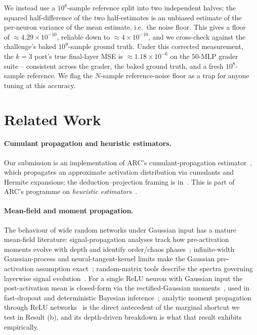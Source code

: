 \documentclass[11pt]{article}
\theoremstyle{remark}
\begin{document}
We instead use a $10^8$-sample reference split into two independent halves; the
squared half-difference of the two half-estimates is an unbiased estimate of the
per-neuron variance of the mean estimate, i.e.\ the noise floor. This gives a
floor of $\approx 4.29\times10^{-10}$, reliable down to $\approx 4\times
10^{-10}$, and we cross-check against the challenge's baked $10^9$-sample ground
truth. Under this corrected measurement, the $k{=}3$ port's true final-layer
MSE is $\approx 1.18\times10^{-6}$ on the $50$-MLP grader suite -- consistent
across the grader, the baked ground truth, and a fresh $10^8$-sample reference.
We flag the $N$-sample reference-noise floor as a trap for anyone tuning at this
accuracy.

\section{Related Work}
\label{sec:related}

\paragraph{Cumulant propagation and heuristic estimators.}
Our submission is an implementation of ARC's cumulant-propagation
estimator~\cite{wu2026wide}, which propagates an approximate activation
distribution via cumulants and Hermite expansions; the deduction--projection
framing is in~\cite{wu2025deduction}. This is part of ARC's programme on
\emph{heuristic estimators}~\cite{christiano2024iterated, xu2021lpe}.

\paragraph{Mean-field and moment propagation.}
The behaviour of wide random networks under Gaussian input has a mature
mean-field literature: signal-propagation analyses track how pre-activation
moments evolve with depth and identify order/chaos
phases~\cite{poole2016exponential, schoenholz2017deep}; infinite-width
Gaussian-process and neural-tangent-kernel limits make the Gaussian
pre-activation assumption exact~\cite{lee2018deep, jacot2018ntk};
random-matrix tools describe the spectra governing layerwise signal
evolution~\cite{pennington2017nonlinear}. For a single ReLU neuron with
Gaussian input the post-activation mean is closed-form via the
rectified-Gaussian moments~\cite{frey1999variational}, used in fast-dropout and
deterministic Bayesian inference~\cite{wang2013fast, hernandez2015pbp,
wu2019deterministic}; analytic moment propagation through ReLU
networks~\cite{wright2024analytic} is the direct antecedent of the marginal
shortcut we test in Result (b), and its depth-driven breakdown is what that
result exhibits empirically.
\end{document}
